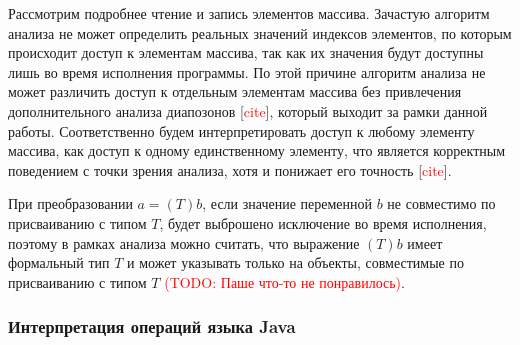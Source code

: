 \documentclass[14pt,titlepage]{extarticle}
\newcommand{\todo}[1]{\textcolor{red}{(\eng{TODO}: #1)}}
\newcommand{\todocite}{[\textcolor{red}{\eng{cite}}]}
\newcommand{\eng}[1]{{\English#1}}
\begin{document}
      Рассмотрим подробнее чтение и запись элементов массива. Зачастую
      алгоритм анализа не может определить реальных значений индексов
      элементов, по которым происходит доступ к элементам массива, так как их
      значения будут доступны лишь во время исполнения программы.
      По этой причине алгоритм анализа не может различить доступ к отдельным
      элементам массива без привлечения дополнительного анализа диапозонов
      \todocite, который выходит за рамки данной работы.
      Соответственно будем интерпретировать доступ к любому элементу массива,
      как доступ к одному единственному элементу, что является корректным
      поведением с точки зрения анализа, хотя и понижает его точность
      \todocite.

      При преобразовании $a = (T)b$, если значение переменной $b$ не совместимо
      по присваиванию с типом $T$, будет выброшено исключение во время
      исполнения, поэтому в рамках анализа можно считать, что выражение $(T)b$
      имеет формальный тип $T$ и может указывать только на объекты, совместимые
      по присваиванию с типом $T$ \todo{Паше что-то не понравилось}.

      \subsubsection{Интерпретация операций языка Java}
\end{document}
